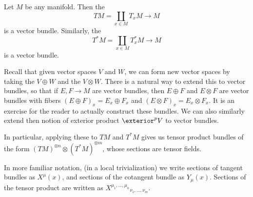 \documentclass[a4paper]{article}
\begin{document}
\begin{eg}
  Let $M$ be any manifold. Then the 
  \[
    TM = \coprod_{x \in M} T_x M \to M
  \]
  is a vector bundle. Similarly, the 
  \[
    T^*M = \coprod_{x \in M} T_x^* M \to M
  \]
  is a vector bundle.

  Recall that given vector spaces $V$ and $W$, we can form new vector spaces by taking the  $V \oplus W$ and the  $V \otimes W$. There is a natural way to extend this to vector bundles, so that if $E, F \to M$ are vector bundles, then $E \oplus F$ and $E \otimes F$ are vector bundles with fibers $(E \oplus F)_x = E_x \oplus F_x$ and $(E \otimes F)_x = E_x \otimes F_x$. It is an exercise for the reader to actually construct these bundles. We can also similarly extend then notion of exterior product $\exterior^p V$ to vector bundles.

  In particular, applying these to $TM$ and $T^*M$ gives us tensor product bundles of the form $(TM)^{\otimes n} \otimes (T^*M)^{\otimes m}$, whose sections are tensor fields.

  In more familiar notation, (in a local trivialization) we write sections of tangent bundles as $X^\mu(x)$, and sections of the cotangent bundle as $Y_\mu(x)$. Sections of the tensor product are written as $X^{\mu_1, \ldots, \mu_n}\!_{\nu_1, \ldots, \nu_m}$.
\end{eg}
\end{document}

